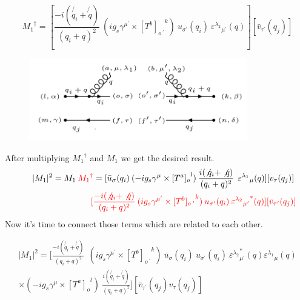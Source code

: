 \begin{equation}
{M_1}^{\dagger} = [\frac{-i(\not{q_i} + \not{q})}{(q_i + q)^2} \:  (ig_s \gamma^{{\mu}^{\prime}}\times {[T^b]_{o\:^{\prime}}}^k) \: u_{{\sigma}^{\prime}}(q_i) \: {\varepsilon^{\lambda_2}}_{{\mu}^{\prime}} (q)][{\bar{v}}_{{\tau}^{\prime}}(q_j)]
\end{equation}
\pagebreak
\begin{figure}[h!]
\centering
\includegraphics[width=0.85\textwidth]{images/QQ/qgqbarMSquer.png}
\end{figure}
After multiplying $ {M_1}^{\dagger} $ and $ {M_1} $ we get the desired result.
\begin{equation}
\begin{split}
|M_1|^2=M_1\:{\color[RGB]{255,0,0} {M_1}^{\dagger}} = [{\bar{u}}_{\sigma}(q_i)\: (-ig_s \gamma^{\mu}\times {[T^a]_o}^l) \: \frac{i(\not{q_i} + \not{q})}{(q_i + q)^2}\:\: {\varepsilon^{\lambda_1}}_{\mu} (q)] [{v}_{\tau}(q_j)]\: \\
\quad\quad\quad\quad\quad\quad\quad\quad\:\:{\color[RGB]{255,0,0}[\frac{-i(\not{q_i} + \not{q})}{(q_i + q)^2} \:  (ig_s \gamma^{{\mu}^{\prime}}\times {[T^b]_{o\:^{\prime}}}^k) \: u_{{\sigma}^{\prime}}(q_i) \: {{\varepsilon^{\lambda_2}}_{{\mu}^{\prime}}}^* (q)][{\bar{v}}_{{\tau}^{\prime}}(q_j)]}
\end{split}
\end{equation}
Now it's time to connect those terms which are related to each other.

\begin{equation}
\begin{split}
|M_1|^2=[\frac{-i(\not{q_i} + \not{q})}{(q_i + q)^2} \:
 \:  (ig_s \gamma^{{\mu}^{\prime}}\times {[T^b]_{o\:^{\prime}}}^k) \: {\bar{u}}_{\sigma}(q_i)\:u_{{\sigma}^{\prime}}(q_i) \: {{\varepsilon^{\lambda_2}}_{{\mu}^{\prime}}^* (q) {\varepsilon^{\lambda_1}}_{\mu} (q)} \\
\times (-ig_s \gamma^{\mu}\times {[T^a]_o}^l) \: \frac{i(\not{q_i} + \not{q})}{(q_i + q)^2} ]
[{\bar{v}}_{{\tau}^{\prime}}(q_j) {v}_{\tau}(q_j)]
\end{split}
\end{equation}

